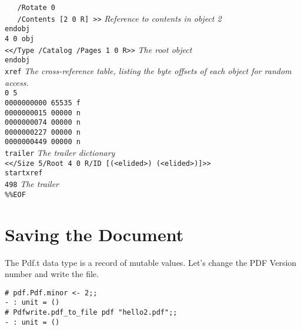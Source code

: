 \documentclass[a4paper]{memoir}
\begin{document}
\begin{framed}
\noindent\small\verb!   /Rotate 0!\\
\noindent\small\verb!   /Contents [2 0 R] >>! \textit{Reference to contents in object 2}\\
\noindent\small\verb!endobj!\\
\noindent\small\verb!4 0 obj!\\
\noindent\small\verb!<</Type /Catalog /Pages 1 0 R>>! \textit{The root object}\\
\noindent\small\verb!endobj!\\
\noindent\small\verb!xref! \textit{The cross-reference table, listing the byte offsets of each object for random access.}\\
\noindent\small\verb!0 5 !\\
\noindent\small\verb!0000000000 65535 f !\\
\noindent\small\verb!0000000015 00000 n !\\
\noindent\small\verb!0000000074 00000 n !\\
\noindent\small\verb!0000000227 00000 n !\\
\noindent\small\verb!0000000449 00000 n !\\
\noindent\small\verb!trailer! \textit{The trailer dictionary}\\
\noindent\small\verb!<</Size 5/Root 4 0 R/ID [(<elided>) (<elided>)]>>!\\
\noindent\small\verb!startxref!\\
\noindent\small\verb!498! \textit{The trailer}\\
\noindent\small\verb!%%EOF!\\
\end{framed}
\section*{Saving the Document}
The \textsf{Pdf.t} data type is a record of mutable values. Let's change the PDF Version number and write the file.
\begin{framed}
\begin{verbatim}
# pdf.Pdf.minor <- 2;;
- : unit = ()
# Pdfwrite.pdf_to_file pdf "hello2.pdf";;
- : unit = ()
\end{verbatim}
\end{framed}
\end{document}
